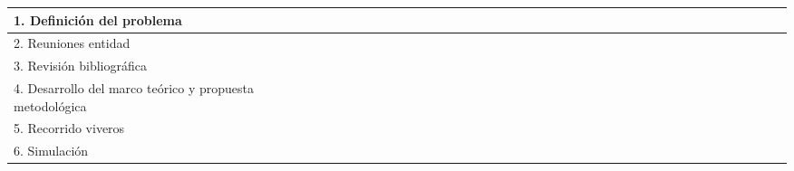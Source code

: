 \begin{table}[htbp]
{\begin{tabular}{|lr|r|r|r|r|r|r|r|r|r|r|r|r|r|r|r|r|r|r|r|r|r|r|r|r|r|r|r|r|r|r|r|r|r|r|r|r|}
    \hline
    \multicolumn{2}{|l|}{1. Definici\'{o}n del problema} &       &       &       &       &       &       &       &       &       &       &       &       &       &       &       &       &       &       &       &       &       &       &       &       &       &       &       &       &       &       &       &       &       &       &       &  \\
    \hline
    \multicolumn{2}{|l|}{2. Reuniones entidad} &       &       &       &       &       &       &       &       &       &       &       &       &       &       &       &       &       &       &       &       &       &       &       &       & \cellcolor[rgb]{ .357,  .608,  .835} &       &       &       &       &       &       &       & \cellcolor[rgb]{ .357,  .608,  .835} &       &       &  \\
    \hline
    \multicolumn{2}{|l|}{3. Revisi\'{o}n bibliogr\'{a}fica} &       &       &       &       &       &       &       &       &       &       &       &       &       &       &       &       &       &       &       &       &       &       &       &       &       &       &       &       &       &       &       &       &       &       &       &  \\
    \hline
    \multicolumn{2}{|l|}{4. Desarrollo del marco te\'{o}rico y propuesta metodol\'{o}gica} &       &       &       &       &       &       &       &       &       &       &       &       &       &       &       &       &       &       &       &       &       &       &       &       &       &       &       &       &       &       &       &       &       &       &       &  \\
    \hline
    \multicolumn{2}{|l|}{5. Recorrido viveros} &       &       &       &       &       &       &       &       &       &       &       &       &       &       &       &       &       &       &       &       &       &       &       &       &       &       &       &       &       &       &       &       &       &       &       &  \\
    \hline
    \multicolumn{2}{|l|}{6. Simulaci\'{o}n} & \cellcolor[rgb]{ .357,  .608,  .835} & \cellcolor[rgb]{ .357,  .608,  .835} & \cellcolor[rgb]{ .357,  .608,  .835} & \cellcolor[rgb]{ .357,  .608,  .835} & \cellcolor[rgb]{ .357,  .608,  .835} & \cellcolor[rgb]{ .357,  .608,  .835} & \cellcolor[rgb]{ .357,  .608,  .835} & \cellcolor[rgb]{ .357,  .608,  .835} & \cellcolor[rgb]{ .357,  .608,  .835} & \cellcolor[rgb]{ .357,  .608,  .835} & \cellcolor[rgb]{ .357,  .608,  .835} & \cellcolor[rgb]{ .357,  .608,  .835} & \cellcolor[rgb]{ .357,  .608,  .835} & \cellcolor[rgb]{ .357,  .608,  .835} & \cellcolor[rgb]{ .357,  .608,  .835} & \cellcolor[rgb]{ .357,  .608,  .835} &       &       &       &       &       &       &       &       &       &       &       &       &       &       &       &       &       &       &       &  \\

\end{tabular}}
\end{table}
